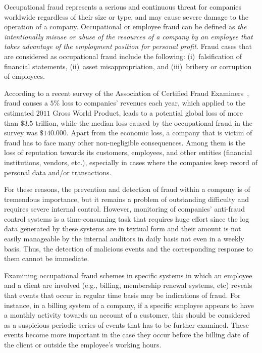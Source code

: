 \documentclass[conference]{IEEEtran}
\begin{document}
Occupational fraud represents a serious and continuous threat for
companies worldwide regardless of their size or type, and may cause
severe damage to the operation of a company. Occupational or
employee fraud can be defined as \emph{the intentionally misuse or
abuse of the resources of a company by an employee that takes
advantage of the employment position for personal profit}. Fraud
cases that are considered as occupational fraud include the
following: (i)~falsification of financial statements, (ii)~asset
misappropriation, and (iii)~bribery or corruption of employees.

According to a recent survey of the Association of Certified Fraud
Examiners~\cite{ACFE12}, fraud causes a $5\%$ loss to companies'
revenues each year, which applied to the estimated $2011$ Gross
World Product, leads to a potential global loss of more than $\$3.5$
trillion, while the median loss caused by the occupational fraud in
the survey was $\$140.000$. Apart from the economic loss, a company
that is victim of fraud has to face many other non-negligible
consequences. Among them is the loss of reputation towards its
customers, employees, and other entities (financial institutions,
vendors, etc.), especially in cases where the companies keep record
of personal data and/or transactions.

For these reasons, the prevention and detection of fraud within a
company is of tremendous importance, but it remains a problem of
outstanding difficulty and requires severe internal control.
However, monitoring of companies' anti-fraud control systems is a
time-consuming task that requires huge effort since the log data
generated by these systems are in textual form and their amount is
not easily manageable by the internal auditors in daily basis not
even in a weekly basis. Thus, the detection of malicious events and
the corresponding response to them cannot be immediate.

Examining occupational fraud schemes in specific systems in which an
employee and a client are involved (e.g., billing, membership
renewal systems, etc) reveals that events that occur in regular time
basis may be indications of fraud. For instance, in a billing system
of a company, if a specific employee appears to have a monthly
activity towards an account of a customer, this should be considered
as a suspicious periodic series of events that has to be further
examined. These events become more important in the case they occur
before the billing date of the client or outside the employee's
working hours.
\end{document}
